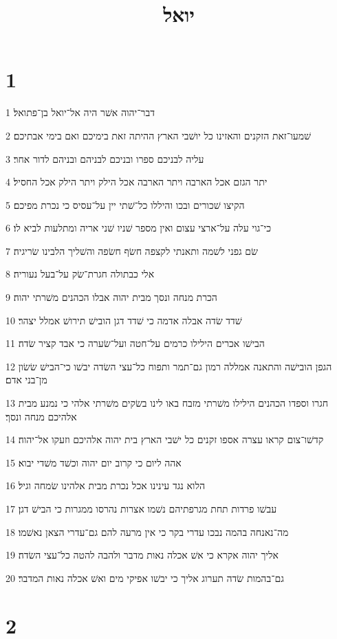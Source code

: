 

\title{יואל}


\chapter{1}

\par 1 דבר־יהוה אשׁר היה אל־יואל בן־פתואל׃
\par 2 שׁמעו־זאת הזקנים והאזינו כל יושׁבי הארץ ההיתה זאת בימיכם ואם בימי אבתיכם׃
\par 3 עליה לבניכם ספרו ובניכם לבניהם ובניהם לדור אחר׃
\par 4 יתר הגזם אכל הארבה ויתר הארבה אכל הילק ויתר הילק אכל החסיל׃
\par 5 הקיצו שׁכורים ובכו והיללו כל־שׁתי יין על־עסיס כי נכרת מפיכם׃
\par 6 כי־גוי עלה על־ארצי עצום ואין מספר שׁניו שׁני אריה ומתלעות לביא לו׃
\par 7 שׂם גפני לשׁמה ותאנתי לקצפה חשׂף חשׂפה והשׁליך הלבינו שׂריגיה׃
\par 8 אלי כבתולה חגרת־שׂק על־בעל נעוריה׃
\par 9 הכרת מנחה ונסך מבית יהוה אבלו הכהנים משׁרתי יהוה׃
\par 10 שׁדד שׂדה אבלה אדמה כי שׁדד דגן הובישׁ תירושׁ אמלל יצהר׃
\par 11 הבישׁו אכרים הילילו כרמים על־חטה ועל־שׂערה כי אבד קציר שׂדה׃
\par 12 הגפן הובישׁה והתאנה אמללה רמון גם־תמר ותפוח כל־עצי השׂדה יבשׁו כי־הבישׁ שׂשׂון מן־בני אדם׃
\par 13 חגרו וספדו הכהנים הילילו משׁרתי מזבח באו לינו בשׂקים משׁרתי אלהי כי נמנע מבית אלהיכם מנחה ונסך׃
\par 14 קדשׁו־צום קראו עצרה אספו זקנים כל ישׁבי הארץ בית יהוה אלהיכם וזעקו אל־יהוה׃
\par 15 אהה ליום כי קרוב יום יהוה וכשׁד משׁדי יבוא׃
\par 16 הלוא נגד עינינו אכל נכרת מבית אלהינו שׂמחה וגיל׃
\par 17 עבשׁו פרדות תחת מגרפתיהם נשׁמו אצרות נהרסו ממגרות כי הבישׁ דגן׃
\par 18 מה־נאנחה בהמה נבכו עדרי בקר כי אין מרעה להם גם־עדרי הצאן נאשׁמו׃
\par 19 אליך יהוה אקרא כי אשׁ אכלה נאות מדבר ולהבה להטה כל־עצי השׂדה׃
\par 20 גם־בהמות שׂדה תערוג אליך כי יבשׁו אפיקי מים ואשׁ אכלה נאות המדבר׃

\chapter{2}

